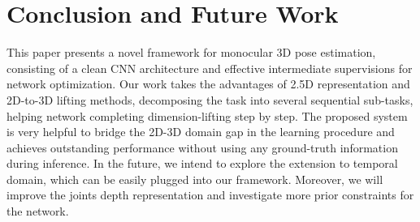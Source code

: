 \documentclass[letterpaper]{article} \usepackage{aaai21}  \usepackage{times}  \usepackage{helvet} \usepackage{courier}  \usepackage[hyphens]{url}  \usepackage{graphicx} \urlstyle{rm} \def\UrlFont{\rm}  \usepackage{natbib}  \usepackage{caption} \frenchspacing  \setlength{\pdfpagewidth}{8.5in}  \setlength{\pdfpageheight}{11in}
\begin{document}
\section{Conclusion and Future Work}
This paper presents a novel framework for monocular 3D pose estimation, consisting of a clean CNN architecture and effective intermediate supervisions for network optimization. Our work takes the advantages of 2.5D representation and 2D-to-3D lifting methods, decomposing the task into several sequential sub-tasks, helping network completing dimension-lifting step by step. The proposed system is very helpful to bridge the 2D-3D domain gap in the learning procedure and achieves outstanding performance without using any ground-truth information during inference. In the future, we intend to explore the extension to temporal domain, which can be easily plugged into our framework. Moreover, we will improve the joints depth representation and investigate more prior constraints for the network.



\end{document}
